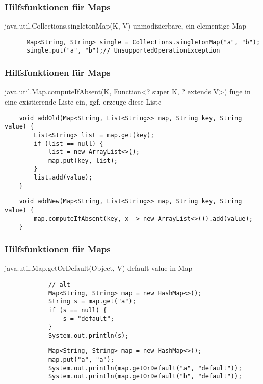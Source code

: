 \begin{frame}[fragile]
  \frametitle{Hilfsfunktionen für Maps}
  
  \begin{block}{java.util.Collections.singletonMap(K, V)}
    unmodizierbare, ein-elementige Map
    \begin{lstlisting}
      Map<String, String> single = Collections.singletonMap("a", "b");
      single.put("a", "b");// UnsupportedOperationException
    \end{lstlisting}
  \end{block}
  
\end{frame}

\begin{frame}[fragile]
  \frametitle{Hilfsfunktionen für Maps}

  \begin{block}{java.util.Map.computeIfAbsent(K, Function\textless ? super K, ? extends V\textgreater)}
    füge in eine existierende Liste ein, ggf. erzeuge diese Liste
    \begin{lstlisting}
    void addOld(Map<String, List<String>> map, String key, String value) {
        List<String> list = map.get(key);
        if (list == null) {
            list = new ArrayList<>();
            map.put(key, list);
        }
        list.add(value);
    }
      \end{lstlisting}
      \pause
      \begin{lstlisting}
    void addNew(Map<String, List<String>> map, String key, String value) {
        map.computeIfAbsent(key, x -> new ArrayList<>()).add(value);
    }
    \end{lstlisting}
  \end{block}

\end{frame}

\begin{frame}[fragile]
  \frametitle{Hilfsfunktionen für Maps}

  \begin{block}{java.util.Map.getOrDefault(Object, V)}
    default value in Map
    \begin{lstlisting}
            // alt
            Map<String, String> map = new HashMap<>();
            String s = map.get("a");
            if (s == null) {
                s = "default";
            }
            System.out.println(s);
      \end{lstlisting}
      \pause
      \begin{lstlisting}
            Map<String, String> map = new HashMap<>();
            map.put("a", "a");
            System.out.println(map.getOrDefault("a", "default"));
            System.out.println(map.getOrDefault("b", "default"));
    \end{lstlisting}
  \end{block}

\end{frame}

